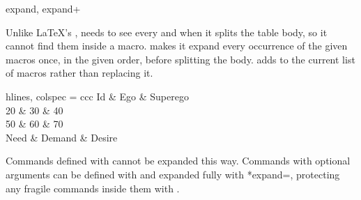 \begin{codedescribe}[
        key,
        new=2021M,
        update=2024A
    ]{expand, expand+}
    \begin{codesyntax}
    \end{codesyntax}
    Unlike \LaTeX's ,  needs to see every \tsverb{&} and \tsverb{\\} when it splits the table body, so it cannot find them inside a macro.  makes it expand every occurrence of the given macros once, in the given order, before splitting the body.  adds to the current list of macros rather than replacing it.

    \begin{codestore}[st=outer:expand]
        \newcommand*\tblrrowa{20 & 30 & 40 \\}
        \newcommand*\tblrrowb{50 & 60 & 70 \\}
        \begin{tblr}[
                expand = \tblrrowa,
                expand+ = \tblrrowb,
            ]{hlines, colspec = {ccc}}
            Id   & Ego    & Superego \\
            \tblrrowa
            \tblrrowb
            Need & Demand & Desire
        \end{tblr}\end{codestore}
    \begin{center}
    \end{center}
    \begin{tsremark}
        Commands defined with  cannot be expanded this way. Commands with optional arguments can be defined with  and expanded fully with \tsverb**{expand=\expanded}, protecting any fragile commands inside them with .
    \end{tsremark}
\end{codedescribe}
